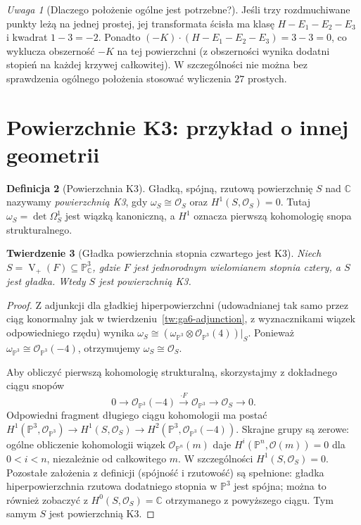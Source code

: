 \documentclass[11pt,a4paper,openany]{report}
\numberwithin{equation}{section}
\theoremstyle{plain}
\newtheorem{twierdzenie}{Twierdzenie}[section]
\theoremstyle{definition}
\newtheorem{definicja}[twierdzenie]{Definicja}
\theoremstyle{remark}
\newtheorem{uwaga}[twierdzenie]{Uwaga}
\newcommand{\C}{\mathbb C}
\newcommand{\PP}{\mathbb P}
\newcommand{\V}{\operatorname V}
\begin{document}
\begin{uwaga}[Dlaczego położenie ogólne jest potrzebne?]
Jeśli trzy rozdmuchiwane punkty leżą na jednej prostej,
jej transformata ścisła ma klasę $H-E_1-E_2-E_3$
i kwadrat $1-3=-2$. Ponadto
$(-K)\cdot(H-E_1-E_2-E_3)=3-3=0$,
co wyklucza obszerność $-K$ na tej powierzchni
(z obszerności wynika dodatni stopień na każdej
krzywej całkowitej). W szczególności nie można
bez sprawdzenia ogólnego położenia stosować
wyliczenia $27$ prostych.
\end{uwaga}

\section{Powierzchnie K3: przykład o innej geometrii}
\label{sec:ga6-k3}

\begin{definicja}[Powierzchnia K3]
Gładką, spójną, rzutową powierzchnię $S$ nad $\C$
nazywamy \emph{powierzchnią K3}, gdy
$\omega_S\cong\mathcal O_S$ oraz
$H^1(S,\mathcal O_S)=0$. Tutaj
$\omega_S=\det\Omega_S^1$ jest wiązką kanoniczną,
a $H^1$ oznacza pierwszą kohomologię snopa strukturalnego.
\end{definicja}

\begin{twierdzenie}[Gładka powierzchnia stopnia czwartego jest K3]
\label{tw:ga6-quartic-k3}
Niech $S=\V_+(F)\subseteq\PP^3_\C$, gdzie $F$
jest jednorodnym wielomianem stopnia cztery, a $S$
jest gładka. Wtedy $S$ jest powierzchnią K3.
\end{twierdzenie}
\begin{proof}
Z adjunkcji dla gładkiej hiperpowierzchni
(udowadnianej tak samo przez ciąg konormalny jak
w twierdzeniu~\ref{tw:ga6-adjunction}, z wyznacznikami
wiązek odpowiedniego rzędu) wynika
$\omega_S\cong(\omega_{\PP^3}\otimes
\mathcal O_{\PP^3}(4))|_S$.
Ponieważ $\omega_{\PP^3}\cong\mathcal O_{\PP^3}(-4)$,
otrzymujemy $\omega_S\cong\mathcal O_S$.

Aby obliczyć pierwszą kohomologię strukturalną,
skorzystajmy z dokładnego ciągu snopów
\[
0\longrightarrow\mathcal O_{\PP^3}(-4)
\xrightarrow{\cdot F}\mathcal O_{\PP^3}
\longrightarrow\mathcal O_S\longrightarrow0.
\]
Odpowiedni fragment długiego ciągu kohomologii ma postać
$H^1(\PP^3,\mathcal O_{\PP^3})\to
H^1(S,\mathcal O_S)\to
H^2(\PP^3,\mathcal O_{\PP^3}(-4))$.
Skrajne grupy są zerowe: ogólne obliczenie kohomologii
wiązek $\mathcal O_{\PP^n}(m)$ daje
$H^i(\PP^n,\mathcal O(m))=0$ dla $0<i<n$,
niezależnie od całkowitego $m$. W szczególności
$H^1(S,\mathcal O_S)=0$.
Pozostałe założenia z definicji (spójność i
rzutowość) są spełnione: gładka hiperpowierzchnia
rzutowa dodatniego stopnia w $\PP^3$ jest spójna;
można to również zobaczyć z
$H^0(S,\mathcal O_S)=\C$ otrzymanego z powyższego
ciągu. Tym samym $S$ jest powierzchnią K3.
\end{proof}
\end{document}
